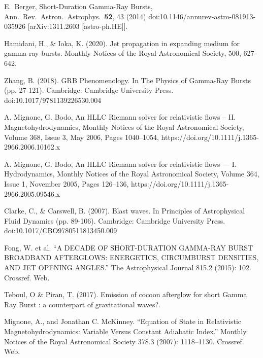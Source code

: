 \documentclass[12pt,a4paper]{book}
\begin{document}
\begin{thebibliography}{20}


  E.~Berger,
  Short-Duration Gamma-Ray Bursts,
  Ann.\ Rev.\ Astron.\ Astrophys.\  {\bf 52}, 43 (2014)
  doi:10.1146/annurev-astro-081913-035926
  [arXiv:1311.2603 [astro-ph.HE]].
 

Hamidani, H., \& Ioka, K. (2020). Jet propagation in expanding medium for gamma-ray bursts. Monthly Notices of the Royal Astronomical Society, 500, 627-642.

Zhang, B. (2018). GRB Phenomenology. In The Physics of Gamma-Ray Bursts (pp. 27-121). Cambridge: Cambridge University Press. doi:10.1017/9781139226530.004

A. Mignone, G. Bodo, An HLLC Riemann solver for relativistic flows – II. Magnetohydrodynamics, Monthly Notices of the Royal Astronomical Society, Volume 368, Issue 3, May 2006, Pages 1040–1054, https://doi.org/10.1111/j.1365-2966.2006.10162.x

A. Mignone, G. Bodo, An HLLC Riemann solver for relativistic flows — I. Hydrodynamics, Monthly Notices of the Royal Astronomical Society, Volume 364, Issue 1, November 2005, Pages 126–136, https://doi.org/10.1111/j.1365-2966.2005.09546.x

Clarke, C., \& Carswell, B. (2007). Blast waves. In Principles of Astrophysical Fluid Dynamics (pp. 89-106). Cambridge: Cambridge University Press. doi:10.1017/CBO9780511813450.009

Fong, W. et al. “A DECADE OF SHORT-DURATION GAMMA-RAY BURST BROADBAND AFTERGLOWS: ENERGETICS, CIRCUMBURST DENSITIES, AND JET OPENING ANGLES.” The Astrophysical Journal 815.2 (2015): 102. Crossref. Web.

Teboul, O \& Piran, T. (2017). Emission of cocoon afterglow for short Gamma Ray Burst : a counterpart of gravitational waves?. 

Mignone, A., and Jonathan C. McKinney. “Equation of State in Relativistic Magnetohydrodynamics: Variable Versus Constant Adiabatic Index.” Monthly Notices of the Royal Astronomical Society 378.3 (2007): 1118–1130. Crossref. Web.


\end{thebibliography}
\end{document}
